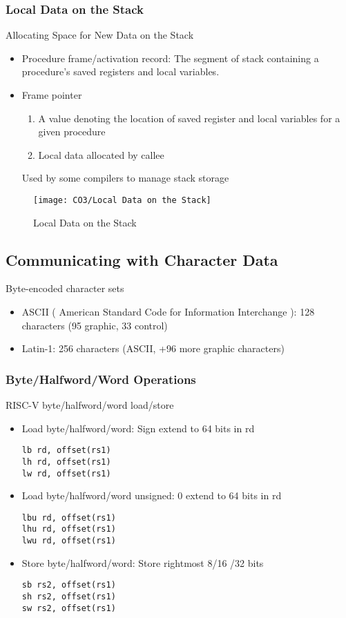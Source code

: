 \subsubsection{Local Data on the Stack}
Allocating Space for New Data on the Stack
\begin{itemize}
    \item Procedure frame/activation record: The segment of stack containing a procedure's saved registers and local variables. 
    \item Frame pointer
    \begin{enumerate}
        \item\small A value denoting the location of saved register and local variables for a given procedure
        \item\small Local data allocated by callee
    \end{enumerate}
    Used by some compilers to manage stack storage
\end{itemize}

\begin{figure}[!htb]
    \centering
    \texttt{[image: CO3/Local Data on the Stack]}
    \caption{Local Data on the Stack}
\end{figure}


\subsection{Communicating with Character Data}
Byte-encoded character sets
\begin{itemize}
    \item\small ASCII ( American Standard Code for Information Interchange ): 128 characters (95 graphic, 33 control)
    \item\small Latin-1: 256 characters (ASCII, +96 more graphic characters)
\end{itemize}



\subsubsection{Byte/Halfword/Word Operations}
RISC-V byte/halfword/word load/store
\begin{itemize}
    \item Load byte/halfword/word: Sign extend to 64 bits in rd
    \begin{lstlisting}[language={[x86masm]Assembler}]
lb rd, offset(rs1)
lh rd, offset(rs1)
lw rd, offset(rs1)
    \end{lstlisting}
    \item Load byte/halfword/word unsigned: 0 extend to 64 bits in rd
    \begin{lstlisting}[language={[x86masm]Assembler}]
lbu rd, offset(rs1)
lhu rd, offset(rs1)
lwu rd, offset(rs1)
    \end{lstlisting}
    \item Store byte/halfword/word: Store rightmost 8/16 /32 bits
    \begin{lstlisting}[language={[x86masm]Assembler}]
sb rs2, offset(rs1)
sh rs2, offset(rs1)
sw rs2, offset(rs1)
    \end{lstlisting}
\end{itemize}

